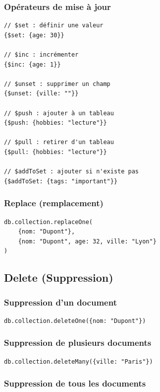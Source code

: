 \documentclass[11pt,a4paper]{article}
\begin{document}
\subsubsection{Opérateurs de mise à jour}

\begin{lstlisting}
// $set : définir une valeur
{$set: {age: 30}}

// $inc : incrémenter
{$inc: {age: 1}}

// $unset : supprimer un champ
{$unset: {ville: ""}}

// $push : ajouter à un tableau
{$push: {hobbies: "lecture"}}

// $pull : retirer d'un tableau
{$pull: {hobbies: "lecture"}}

// $addToSet : ajouter si n'existe pas
{$addToSet: {tags: "important"}}
\end{lstlisting}

\subsubsection{Replace (remplacement)}

\begin{lstlisting}
db.collection.replaceOne(
    {nom: "Dupont"},
    {nom: "Dupont", age: 32, ville: "Lyon"}
)
\end{lstlisting}

\subsection{Delete (Suppression)}

\subsubsection{Suppression d'un document}

\begin{lstlisting}
db.collection.deleteOne({nom: "Dupont"})
\end{lstlisting}

\subsubsection{Suppression de plusieurs documents}

\begin{lstlisting}
db.collection.deleteMany({ville: "Paris"})
\end{lstlisting}

\subsubsection{Suppression de tous les documents}
\end{document}
